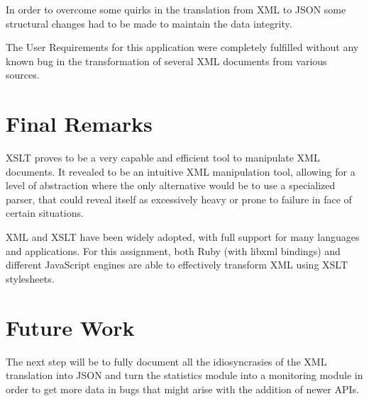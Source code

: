 \documentclass[twocolumn,twoside,10pt,a4paper]{article}
\begin{document}
In order to overcome some quirks in the translation from XML to JSON some structural changes had to be made to maintain the data integrity.

The User Requirements for this application were completely fulfilled without any known bug in the transformation of several XML documents from various sources.

\section{Final Remarks}\label{sec:final-remarks}

XSLT proves to be a very capable and efficient tool to manipulate XML documents. It revealed to be an intuitive XML manipulation tool, allowing for a level of abstraction where the only alternative would be to use a specialized parser, that could reveal itself as excessively heavy or prone to failure in face of certain situations.

XML and XSLT have been widely adopted, with full support for many languages and applications. For this assignment, both Ruby (with libxml bindings) and different JavaScript engines are able to effectively transform XML using XSLT stylesheets.

\section{Future Work}\label{sec:future-work}

The next step will be to fully document all the idiosyncrasies of the XML translation into JSON and turn the statistics module into a monitoring module in order to get more data in bugs that might arise with the addition of newer APIs.

\renewcommand{\bibname}{References}


\end{document}
